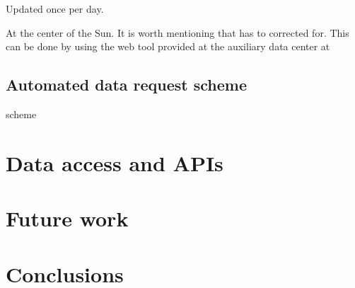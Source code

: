 \documentclass{aa}
\begin{document}
Updated once per day.

At the center of the Sun.
It is worth mentioning that has to corrected for.
This can be done by using the web tool provided at the auxiliary data center at

\subsection{Automated data request scheme}
scheme


\section{Data access and APIs}
\section{Future work}
\section{Conclusions}



%
%



\end{document}
